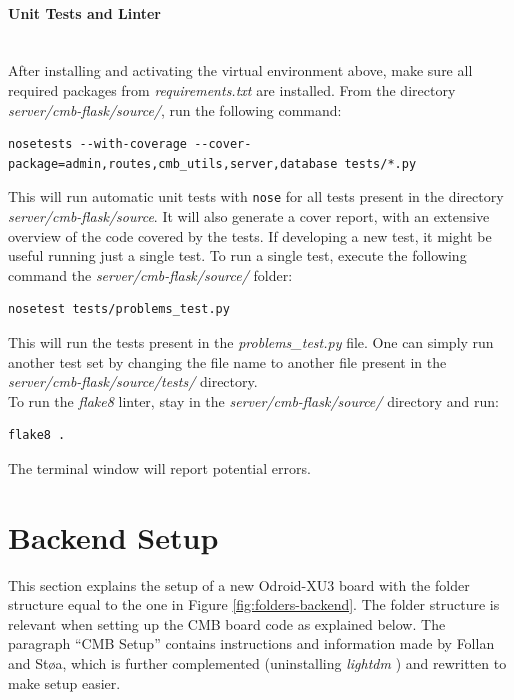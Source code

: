 \paragraph*{Unit Tests and Linter} \hfill \\
After installing and activating the virtual environment above, make sure all required packages from \textit{requirements.txt} are installed. From the directory \textit{server/cmb-flask/source/}, run the following command:
\begin{lstlisting}
nosetests --with-coverage --cover-package=admin,routes,cmb_utils,server,database tests/*.py
\end{lstlisting}
This will run automatic unit tests with \texttt{nose} \cite{NOSE} for all tests present in the directory \textit{server/cmb-flask/source}. It will also generate a cover report, with an extensive overview of the code covered by the tests. If developing a new test, it might be useful running just a single test. To run a single test, execute the following command the \textit{server/cmb-flask/source/} folder:
\begin{lstlisting}
nosetest tests/problems_test.py
\end{lstlisting}
This will run the tests present in the \textit{problems\_test.py} file. One can simply run another test set by changing the file name to another file present in the \textit{server/cmb-flask/source/tests/} directory. \\
\noindent
To run the \textit{flake8} linter, stay in the \textit{server/cmb-flask/source/} directory and run:
\begin{lstlisting}
flake8 .
\end{lstlisting}
The terminal window will report potential errors.

\section{Backend Setup}
\label{sec:bsetup}
This section explains the setup of a new Odroid-XU3 board with the folder structure equal to the one in Figure \ref{fig:folders-backend}. The folder structure is relevant when setting up the CMB board code as explained below. The paragraph ``CMB Setup'' contains instructions and information made by Follan and Støa, which is further complemented (uninstalling \textit{lightdm} \cite{m:lightdm}) and rewritten to make setup easier.

